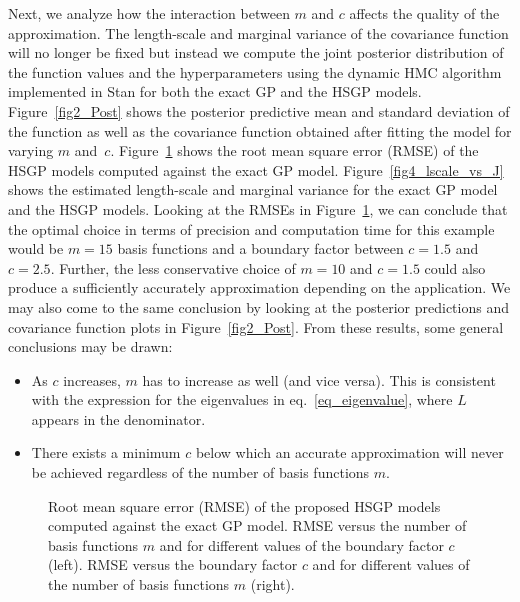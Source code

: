 Next, we analyze how the interaction between $m$ and $c$ affects the quality of the approximation. The length-scale and marginal variance of the covariance function will no longer be fixed but instead we compute the joint posterior distribution of the function values and the hyperparameters using the dynamic HMC algorithm implemented in Stan \citep{StanTeam:2021} for both the exact GP and the HSGP models. Figure~\ref{fig2_Post} shows the posterior predictive mean and standard deviation of the function as well as the covariance function obtained after fitting the model for varying $m$ and~$c$. Figure~\ref{fig3_MSE_vs_J} shows the root mean square error (RMSE) of the HSGP models computed against the exact GP model. Figure~\ref{fig4_lscale_vs_J} shows the estimated length-scale and marginal variance for the exact GP model and the HSGP models. Looking at the RMSEs in Figure~\ref{fig3_MSE_vs_J}, we can conclude that the optimal choice in terms of precision and computation time for this example would be $m = 15$ basis functions and a boundary factor between $c = 1.5$ and $c = 2.5$. Further, the less conservative choice of $m = 10$ and $c = 1.5$ could also produce a sufficiently accurately approximation depending on the application. We may also come to the same conclusion by looking at the posterior predictions and covariance function plots in Figure~\ref{fig2_Post}. From these results, some general conclusions may be drawn:
%
\begin{itemize}
\item As $c$ increases, $m$ has to increase as well (and vice versa). This is consistent with the expression for the eigenvalues in eq.~\eqref{eq_eigenvalue}, where $L$ appears in the denominator.
\item There exists a minimum $c$ below which an accurate approximation will never be achieved regardless of the number of basis functions $m$.
\end{itemize}

\begin{figure} %
\centering
{}
\caption{Root mean square error (RMSE) of the proposed HSGP models computed against the exact GP model. RMSE versus the number of basis functions $m$ and for different values of the boundary factor $c$ (left). RMSE versus the boundary factor $c$ and for different values of the number of basis functions $m$ (right). }
\label{fig3_MSE_vs_J}
\end{figure}

